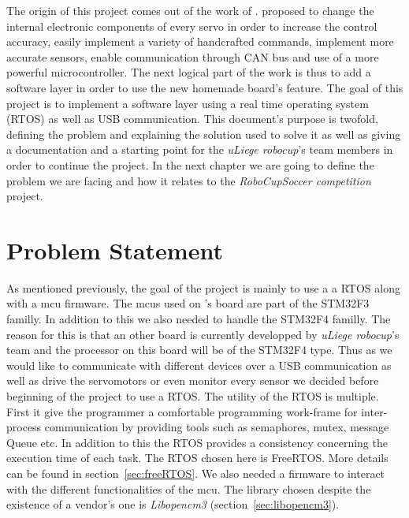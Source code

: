 \documentclass[12pt,a4paper]{report}
\begin{document}
The origin of this project comes out of the work of \cite{masterGL}. \cite{masterGL} proposed to change the internal electronic components of every servo in order to increase the control accuracy, easily implement a variety of handcrafted commands, implement more accurate sensors, enable communication through CAN bus and use of a more powerful microcontroller. The next logical part of the work is thus to add a software layer in order to use the new homemade board's feature.\newline
The goal of this project is to implement a software layer using a real time operating system (RTOS) as well as USB communication.\newline
This document's purpose is twofold, defining the problem and explaining the solution used to solve it as well as giving a documentation and a starting point for the \emph{uLiege robocup}'s team members in order to continue the project.\newline
In the next chapter we are going to define the problem we are facing and how it relates to the \emph{RoboCupSoccer competition} project. \newpage
\chapter{Problem Statement}
\label{ch:prob}
As mentioned previously, the goal of the project is mainly to use a a RTOS along with a mcu firmware. The mcus used on \cite{masterGL}'s board are part of the STM32F3 familly. In addition to this we also needed to handle the STM32F4 familly. The reason for this is that an other board is currently developped by \emph{uLiege robocup}'s team and the processor on this board will be of the STM32F4 type.\newline
Thus as we would like to communicate with different devices over a USB communication as well as drive the servomotors or even monitor every sensor we decided before beginning of the project to use a RTOS.\newline
The utility of the RTOS is multiple. First it give the programmer a comfortable programming work-frame for inter-process communication by providing tools such as semaphores, mutex, message Queue etc. In addition to this the RTOS provides a consistency concerning the execution time of each task.\newline
The RTOS chosen here is FreeRTOS. More details can be found in section~\ref{sec:freeRTOS}. We also needed a firmware to interact with the different functionalities of the mcu. The library chosen despite the existence of a vendor's one is \emph{Libopencm3} (section~\ref{sec:libopencm3}). 
\end{document}
